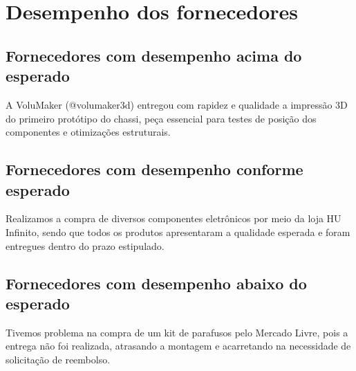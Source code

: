 


\section{Desempenho dos fornecedores}

\subsection{Fornecedores com desempenho acima do esperado}

A VoluMaker (@volumaker3d) entregou com rapidez e qualidade a impressão 3D do primeiro protótipo do chassi, peça essencial para testes de posição dos componentes e otimizações estruturais.

\subsection{Fornecedores com desempenho conforme esperado}

Realizamos a compra de diversos componentes eletrônicos por meio da loja HU Infinito, sendo que todos os produtos apresentaram a qualidade esperada e foram entregues dentro do prazo estipulado.

\subsection{Fornecedores com desempenho abaixo do esperado}

Tivemos problema na compra de um kit de parafusos pelo Mercado Livre, pois a entrega não foi realizada, atrasando a montagem e acarretando na necessidade de solicitação de reembolso.
